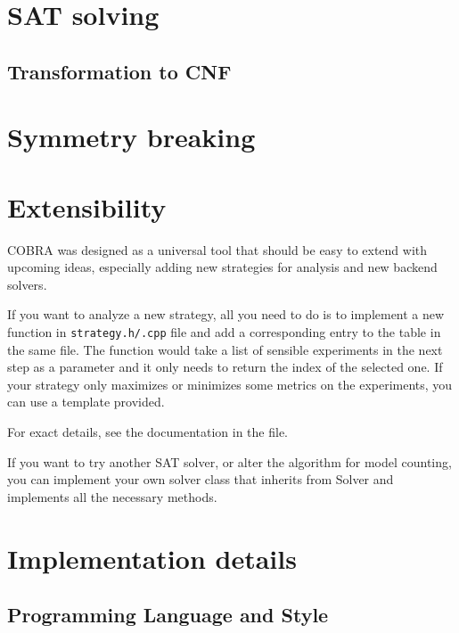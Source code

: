 \section{SAT solving}

\subsection{Transformation to CNF}

\section{Symmetry breaking}

\section{Extensibility}

COBRA was designed as a universal tool that should be easy to extend with
  upcoming ideas, especially adding new strategies for analysis
  and new backend solvers.

If you want to analyze a new strategy, all you need to do is to implement
  a new function in \texttt{strategy.h/.cpp} file and add a corresponding entry
  to the  table in the same file.
The function would take a list of sensible experiments in the next step as a parameter
  and it only needs to return the index of the selected one.
If your strategy only maximizes or minimizes some metrics on the experiments,
  you can use a template provided.

For exact details, see the documentation in the file.

If you want to try another SAT solver, or alter the algorithm for model counting,
  you can implement your own solver class that inherits from Solver and
  implements all the necessary methods.

\section{Implementation details}

\subsection{Programming Language and Style}


